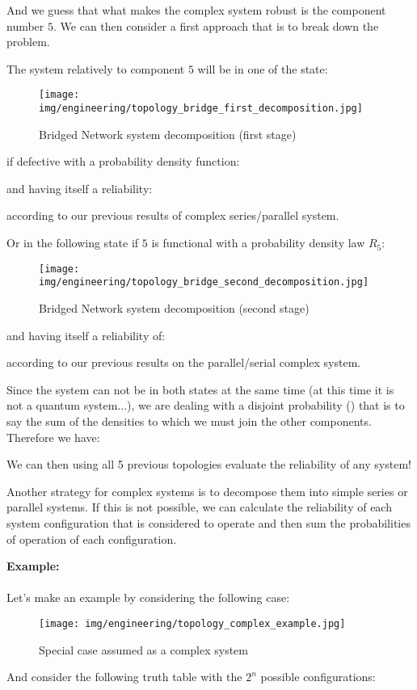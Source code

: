 \begin{enumerate}
		And we guess that what makes the complex system robust is the component number $5$. We can then consider a first approach that is to break down the problem.
		
		The system relatively to component $5$ will be in one of the state:
		\begin{figure}[H]
			\begin{center}
				\texttt{[image: img/engineering/topology\_bridge\_first\_decomposition.jpg]}
			\end{center}	
			\caption[]{Bridged Network system decomposition (first stage)}
		\end{figure}
		if defective with a probability density function:
		
		and having itself a reliability:
		
		according to our previous results of complex series/parallel system.
		
		Or in the following state if $5$ is functional with a probability density law $R_5$:
		\begin{figure}[H]
			\begin{center}
				\texttt{[image: img/engineering/topology\_bridge\_second\_decomposition.jpg]}
			\end{center}	
			\caption[]{Bridged Network system decomposition (second stage)}
		\end{figure}
		and having itself a reliability of:
		
		according to our previous results on the parallel/serial complex system.
		
		Since the system can not be in both states at the same time (at this time it is not a quantum system...), we are dealing with a disjoint probability () that is to say the sum of the densities to which we must join the other components. Therefore we have:
		
	\end{enumerate}
		We can then using all 5 previous topologies evaluate the reliability of any system!
	
	Another strategy for complex systems is to decompose them into simple series or parallel systems. If this is not possible, we can calculate the reliability of each system configuration that is considered to operate and then sum the probabilities of operation of each configuration.
	\begin{tcolorbox}[colframe=black,colback=white,sharp corners]
		\textbf{{\Large {}}Example:}\\\\
		Let's make an example by considering the following case:
		\begin{figure}[H]
			\begin{center}
				\texttt{[image: img/engineering/topology\_complex\_example.jpg]}
			\end{center}	
			\caption[]{Special case assumed as a complex system}
		\end{figure}
		And consider the following truth table with the $2^n$ possible configurations:
	\end{tcolorbox}
	

